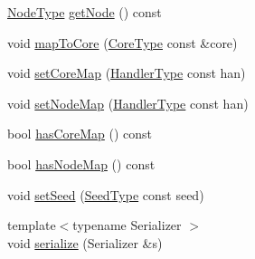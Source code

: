 \begin{DoxyCompactItemize}
\item 
\hyperlink{namespacevt_a866da9d0efc19c0a1ce79e9e492f47e2}{Node\+Type} \hyperlink{structvt_1_1vrt_1_1_virtual_info_aac6a0d894c563a3c347930e872541e1b}{get\+Node} () const
\item 
void \hyperlink{structvt_1_1vrt_1_1_virtual_info_a69fa103c7e796005f8032efc33e236cf}{map\+To\+Core} (\hyperlink{namespacevt_a74b11b22c02feaabab8591acc87c7c52}{Core\+Type} const \&core)
\item 
void \hyperlink{structvt_1_1vrt_1_1_virtual_info_ad2bc75966ac3a5c7faaf14bfe47b5ba4}{set\+Core\+Map} (\hyperlink{namespacevt_af64846b57dfcaf104da3ef6967917573}{Handler\+Type} const han)
\item 
void \hyperlink{structvt_1_1vrt_1_1_virtual_info_acb0b673b07b17b8eb83a91168e6c5658}{set\+Node\+Map} (\hyperlink{namespacevt_af64846b57dfcaf104da3ef6967917573}{Handler\+Type} const han)
\item 
bool \hyperlink{structvt_1_1vrt_1_1_virtual_info_afe2aa8089ee3fde02c189e473e698eb4}{has\+Core\+Map} () const
\item 
bool \hyperlink{structvt_1_1vrt_1_1_virtual_info_ae5153180aa0fdc89268929e9fa334692}{has\+Node\+Map} () const
\item 
void \hyperlink{structvt_1_1vrt_1_1_virtual_info_a5c90fa0c4f42e6e80552a66403137d3f}{set\+Seed} (\hyperlink{namespacevt_ae2e13198bdef4d5b8e603d6c1c7f0969}{Seed\+Type} const seed)
\item 
{\footnotesize template$<$typename Serializer $>$ }\\void \hyperlink{structvt_1_1vrt_1_1_virtual_info_a349b34bb7edcc5f915abed7358630374}{serialize} (Serializer \&s)
\end{DoxyCompactItemize}
